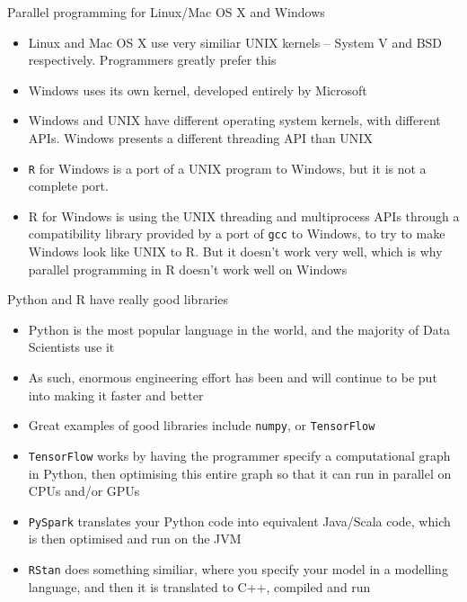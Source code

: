 \documentclass{beamer}
\begin{document}
\begin{frame}{Parallel programming for Linux/Mac OS X and Windows}
	\begin{itemize}

		\item Linux and Mac OS X use very similiar UNIX kernels -- System V and
		BSD respectively. Programmers greatly prefer this
		
		\item Windows uses its own kernel, developed entirely by Microsoft

		\item Windows and UNIX have different operating system kernels, with
		different APIs. Windows presents a different threading API than UNIX
		
		\item \texttt{R} for Windows is a port of a UNIX program to Windows, but
		it is not a complete port.
		
		\item R for Windows is using the UNIX threading and multiprocess APIs
		through a compatibility library provided by a port of \texttt{gcc} to
		Windows, to try to make Windows look like UNIX to R.  But it doesn't
		work very well, which is why parallel programming in R doesn't work well
		on Windows 
		
	\end{itemize}
\end{frame}

\begin{frame}{Python and R have really good libraries}
	\begin{itemize}
		\item Python is the most popular language in the world, and the majority
		of Data Scientists use it
		\item As such, enormous engineering effort has been and will continue to 
		be put into making it faster and better
		\item Great examples of good libraries include \texttt{numpy}, or
		\texttt{TensorFlow}
		\item \texttt{TensorFlow} works by having the programmer specify a computational
		graph in Python, then optimising this entire graph so that it can run
		in parallel on CPUs and/or GPUs
		\item \texttt{PySpark} translates your Python code into equivalent
		Java/Scala code, which is then optimised and run on the JVM
		\item \texttt{RStan} does something similiar, where you specify your model
		in a modelling language, and then it is translated to C++, compiled and
		run
	\end{itemize}
\end{frame}
\end{document}
